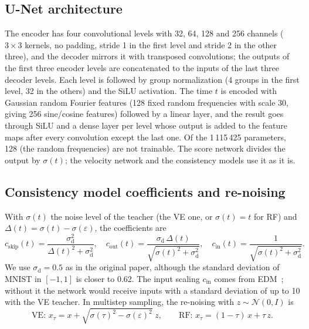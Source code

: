 \documentclass{article}
\begin{document}
\subsection{U-Net architecture}
\label{sec:app_unet}

The encoder has four convolutional levels with 32, 64, 128 and 256 channels
($3\times3$ kernels, no padding, stride 1 in the first level and stride 2 in
the other three), and the decoder mirrors it with transposed convolutions;
the outputs of the first three encoder levels are concatenated to the inputs
of the last three decoder levels. Each level is followed by group
normalization (4 groups in the first level, 32 in the others) and the SiLU
activation. The time $t$ is encoded with Gaussian random Fourier features
(128 fixed random frequencies with scale 30, giving 256 sine/cosine features)
followed by a linear layer, and the result goes through SiLU and a dense layer
per level whose output is added to the feature maps after every convolution
except the last one. Of the 1\,115\,425 parameters, 128 (the random
frequencies) are not trainable. The score network divides the output by
$\sigma(t)$; the velocity network and the consistency models use it as it is.

\subsection{Consistency model coefficients and re-noising}
\label{sec:app_coef}

With $\sigma(t)$ the noise level of the teacher (the VE one, or $\sigma(t) = t$ for
RF) and $\Delta(t) = \sigma(t) - \sigma(\varepsilon)$, the coefficients are
\begin{equation}
  c_\text{skip}(t) = \frac{\sigma_\text{d}^2}{\Delta(t)^2 + \sigma_\text{d}^2}, \quad
  c_\text{out}(t) = \frac{\sigma_\text{d}\,\Delta(t)}{\sqrt{\sigma(t)^2 + \sigma_\text{d}^2}}, \quad
  c_\text{in}(t) = \frac{1}{\sqrt{\sigma(t)^2 + \sigma_\text{d}^2}}.
\end{equation}
We use $\sigma_\text{d} = 0.5$ as in the original paper, although the standard
deviation of MNIST in $[-1, 1]$ is closer to 0.62. The input scaling $c_\text{in}$
comes from EDM~\cite{karras2022edm}; without it the network would receive inputs
with a standard deviation of up to 10 with the VE teacher. In multistep sampling,
the re-noising with $z \sim \mathcal{N}(0, I)$ is
\begin{equation}
  \text{VE: } x_\tau = x + \sqrt{\sigma(\tau)^2 - \sigma(\varepsilon)^2}\; z,
  \qquad
  \text{RF: } x_\tau = (1 - \tau)\, x + \tau\, z.
\end{equation}
\end{document}
